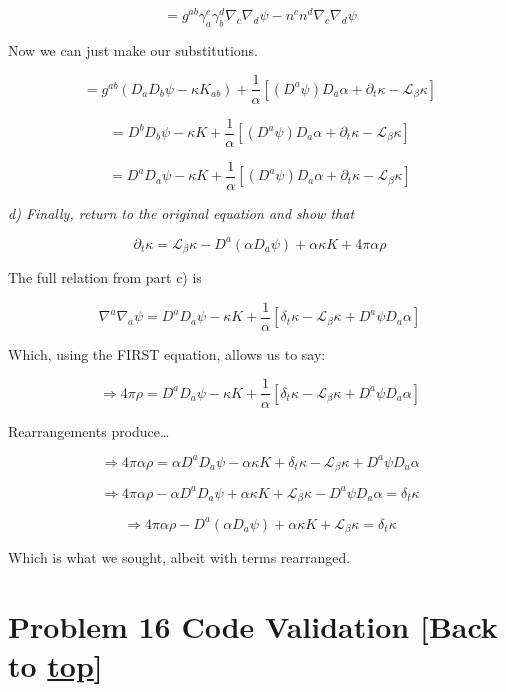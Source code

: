\documentclass[landscape,letterpaper,10pt,english]{article}
\begin{document}
\[ = g^{ab} \gamma^c_a \gamma^d_b \nabla_c \nabla_d \psi - n^cn^d \nabla_c \nabla_d \psi \]

Now we can just make our substitutions.

\[ = g^{ab} (D_aD_b\psi - \kappa K_{ab}) + \frac1\alpha [(D^a\psi)D_a \alpha + \partial_t \kappa - \mathcal{L}_\beta \kappa]  \]

\[ = D^bD_b\psi - \kappa K + \frac1\alpha [(D^a\psi)D_a \alpha + \partial_t \kappa - \mathcal{L}_\beta \kappa]  \]

\[ = D^aD_a\psi - \kappa K + \frac1\alpha [(D^a\psi)D_a \alpha + \partial_t \kappa - \mathcal{L}_\beta \kappa]  \]

    \emph{d) Finally, return to the original equation and show that}

\[ \partial_t \kappa = \mathcal{L}_\beta \kappa - D^a(\alpha D_a \psi) + \alpha \kappa K + 4 \pi \alpha \rho\]

    The full relation from part c) is

\[ \nabla^a \nabla_a \psi = D^a D_a \psi -\kappa K + \frac1\alpha [\delta_t \kappa - \mathcal{L}_\beta \kappa + D^a \psi D_a \alpha] \]

Which, using the FIRST equation, allows us to say:

\[ \Rightarrow 4\pi\rho = D^a D_a \psi -\kappa K + \frac1\alpha [\delta_t \kappa - \mathcal{L}_\beta \kappa + D^a \psi D_a \alpha] \]

Rearrangements produce\ldots{}

\[ \Rightarrow 4\pi\alpha\rho = \alpha D^a D_a \psi -\alpha\kappa K + \delta_t \kappa - \mathcal{L}_\beta \kappa + D^a \psi D_a \alpha \]

\[ \Rightarrow 4\pi\alpha\rho - \alpha D^a D_a \psi + \alpha\kappa K +  \mathcal{L}_\beta \kappa - D^a \psi D_a \alpha  = \delta_t \kappa \]

\[ \Rightarrow 4\pi\alpha\rho -  D^a(\alpha D_a \psi) + \alpha\kappa K +  \mathcal{L}_\beta \kappa  = \delta_t \kappa \]

Which is what we sought, albeit with terms rearranged.

    \hypertarget{problem-16-code-validation-back-to-top}{%
\section{\texorpdfstring{Problem 16 Code Validation {[}Back to
\hyperref[toc]{top}{]}}{Problem 16 Code Validation {[}Back to {]}}}\label{problem-16-code-validation-back-to-top}}
\end{document}
